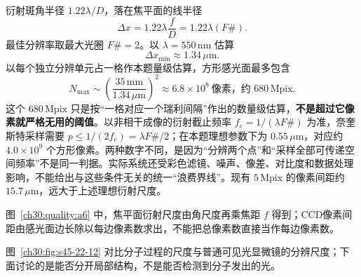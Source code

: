 \begin{xesolution}
\begin{center}\begin{minipage}{.96\linewidth}\centering
{}
\end{minipage}\end{center}

衍射斑角半径 $1.22\lambda/D$，落在焦平面的线半径
\[
 \Delta x=1.22\lambda\frac fD=1.22\lambda(F\#).
\]
最佳分辨率取最大光圈 $F\#=2$。以 $\lambda=550\,\mathrm{nm}$ 估算
\[
 \boxed{\Delta x_{\min}\approx1.34\,\mu\mathrm m}.
\]
以每个独立分辨单元占一格作本题量级估算，方形感光面最多包含
\[
 N_{\max}\sim\left(\frac{35\,\mathrm{mm}}{1.34\,\mu\mathrm m}\right)^2
 \approx\boxed{6.8\times10^8\ \text{像素，约 }680\,\mathrm{Mpix}}.
\]
这个 $680\,\mathrm{Mpix}$ 只是按“一格对应一个瑞利间隔”作出的数量级估算，\textbf{不是超过它像素就严格无用的阈值}。以非相干成像的衍射截止频率 $f_c=1/(\lambda F\#)$ 为准，奈奎斯特采样需要 $p\le1/(2f_c)=\lambda F\#/2$；在本题理想参数下为 $0.55\,\mu\mathrm m$，对应约 $4.0\times10^9$ 个方形像素。两种数字不同，是因为“分辨两个点”和“采样全部可传递空间频率”不是同一判据。实际系统还受彩色滤镜、噪声、像差、对比度和数据处理影响，不能给出与这些条件无关的统一“浪费界线”。现有 $5\,\mathrm{Mpix}$ 的像素间距约 $15.7\,\mu\mathrm m$，远大于上述理想衍射尺度。

图~\ref{ch30:quality:a6} 中，焦平面衍射尺度由角尺度再乘焦距 $f$ 得到；CCD像素间距由感光面边长除以每边像素数求出，不能把总像素数直接当作每边像素数。
\end{xesolution}

\MolecularLimitDiagram
图~\ref{ch30:fig:s45-22-12} 对比分子过程的尺度与普通可见光显微镜的分辨尺度；下面讨论的是能否分开局部结构，不是能否检测到分子发出的光。

